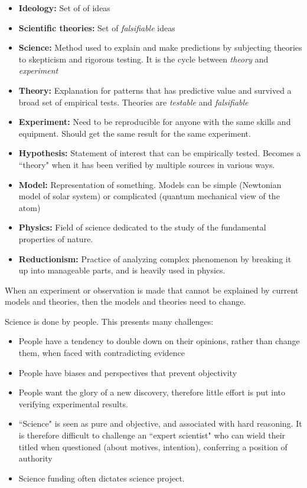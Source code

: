\documentclass[12pt]{article}
\begin{document}
\begin{itemize}
\item \textbf{Ideology:} Set of of ideas
\item \textbf{Scientific theories:} Set of \textit{falsifiable} ideas
\item \textbf{Science:} Method used to explain and make predictions by subjecting theories to skepticism and rigorous testing. It is the cycle between \textit{theory} and \textit{experiment}
\item \textbf{Theory:} Explanation for patterns that has predictive value and survived a broad set of empirical tests. Theories are \textit{testable} and \textit{falsifiable}
\item \textbf{Experiment:} Need to be reproducible for anyone with the same skills and equipment. Should get the same result for the same experiment.
\item \textbf{Hypothesis:} Statement of interest that can be empirically tested. Becomes a ``theory" when it has been verified by multiple sources in various ways.
\item \textbf{Model:} Representation of something. Models can be simple (Newtonian model of solar system) or complicated (quantum mechanical view of the atom)
\item \textbf{Physics:} Field of science dedicated to the study of the fundamental properties of nature.
\item \textbf{Reductionism:} Practice of analyzing complex phenomenon by breaking it up into manageable parts, and is heavily used in physics.
\end{itemize}

When an experiment or observation is made that cannot be explained by current models and theories, then the models and theories need to change.

Science is done by people. This presents many challenges:
\begin{itemize}
\item People have a tendency to double down on their opinions, rather than change them, when faced with contradicting evidence
\item People have biases and perspectives that prevent objectivity
\item People want the glory of a new discovery, therefore little effort is put into verifying experimental results.
\item ``Science" is seen as pure and objective, and associated with hard reasoning. It is therefore difficult to challenge an ``expert scientist" who can wield their titled when questioned (about motives, intention), conferring a position of authority
\item Science funding often dictates science project.
\end{itemize}
\end{document}

